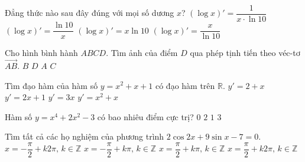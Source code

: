 \begin{ex}%
	Đẳng thức nào sau đây đúng với mọi số dương $x$?
	\choice
	{\True $\left(\log x\right)' = \dfrac{1}{x\cdot\ln 10}$}
	{$\left(\log x\right)' =\dfrac{\ln 10}{x}$}
	{$\left(\log x\right)' =x\ln 10$}
	{$\left(\log x\right)' =\dfrac{x}{\ln 10}$}
\end{ex}

\begin{ex}%
	Cho hình bình hành $ABCD$. Tìm ảnh của điểm $D$ qua phép tịnh tiến theo véc-tơ $\vec{AB}$.
	\choice
	{$B$}
	{$D$}
	{$A$}
	{\True $C$}
\end{ex}

\begin{ex}%
	Tìm đạo hàm của hàm số $y = x^2 +x +1$ có đạo hàm trên $\mathbb{R}$.
	\choice
	{$y'=2+x$}
	{\True $y'=2x+1$}
	{$y'=3x$}
	{$y'=x^2+x$}
\end{ex}

\begin{ex}%
	Hàm số $y = x^4 + 2x^2 -3$ có bao nhiêu điểm cực trị?
	\choice
	{$0$}
	{$2$}
	{\True $1$}
	{$3$}
\end{ex}

\begin{ex}%
	Tìm tất cả các họ nghiệm của phương trình $2\cos 2x +9\sin x -7=0$.
	\choice
	{$x=-\dfrac{\pi}{2}+k2\pi, \, k\in \mathbb{Z}$}
	{$x=-\dfrac{\pi}{2}+k\pi, \, k\in \mathbb{Z}$}
	{$x=\dfrac{\pi}{2}+k\pi, \, k\in \mathbb{Z}$}
	{\True $x=\dfrac{\pi}{2}+k2\pi, \, k\in \mathbb{Z}$}
\end{ex}

